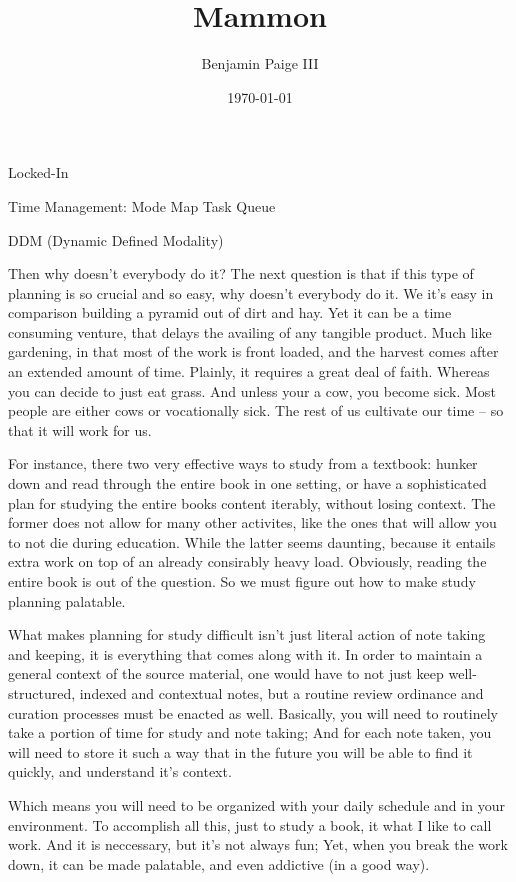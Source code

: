 \title{\bf Mammon}
\author{Benjamin Paige III}
\date{\today}



Locked-In

Time Management:
Mode Map
Task Queue

DDM (Dynamic Defined Modality)

Then why doesn't everybody do it?
	The next question is that if this type of planning is so crucial and so easy, why doesn't everybody do it.  We it's easy in comparison building a pyramid out of dirt and hay.
	Yet it can be a time consuming venture, that delays the availing of any tangible product. Much like gardening, in that most of the work is front loaded, and the harvest comes
	after an extended amount of time.  Plainly, it requires a great deal of faith.  Whereas you can decide to just eat grass.  And unless your a cow, you become sick.  
	Most people are either cows or vocationally sick.  The rest of us cultivate our time -- so that it will work for us.

	For instance, there two very effective ways to study from a textbook: hunker down and read through the entire book in one setting, or have a sophisticated plan for studying the
	entire books content iterably, without losing context.  The former does not allow for many other activites, like the ones that will allow you to not die during education.  While
	the latter seems daunting, because it entails extra work on top of an already consirably heavy load.  Obviously, reading the entire book is out of the question.  So we must 
	figure out how to make study planning palatable.

	What makes planning for study difficult isn't just literal action of note taking and keeping, it is everything that comes along with it.  In order to maintain a general context
	of the source material, one would have to not just keep well-structured, indexed and contextual notes, but a routine review ordinance and curation processes must be enacted as well.
	Basically, you will need to routinely take a portion of time for study and note taking; And for each note taken, you will need to store it such a way that in the future you will be able to find it quickly, and understand it's context.

	Which means you will need to be organized with your daily schedule and in your environment.  To accomplish all this, just to study a book, it what I like to call work.  And it is neccessary, but it's not always fun; Yet, 
	when you break the work down, it can be made palatable, and even addictive (in a good way).

